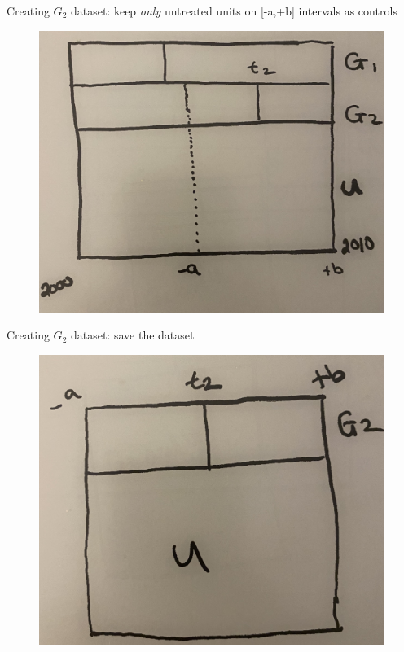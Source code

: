 \documentclass{beamer}
\begin{document}
\begin{frame}{Creating $G_2$ dataset: keep \emph{only} untreated units on [-a,+b] intervals as controls}

	\begin{figure}
	\includegraphics[scale=0.085]{./lecture_includes/stacked4.jpg}
	\end{figure}

\end{frame}


\begin{frame}{Creating $G_2$ dataset: save the dataset}

	\begin{figure}
	\includegraphics[scale=0.085]{./lecture_includes/stacked5.jpg}
	\end{figure}

\end{frame}
\end{document}
